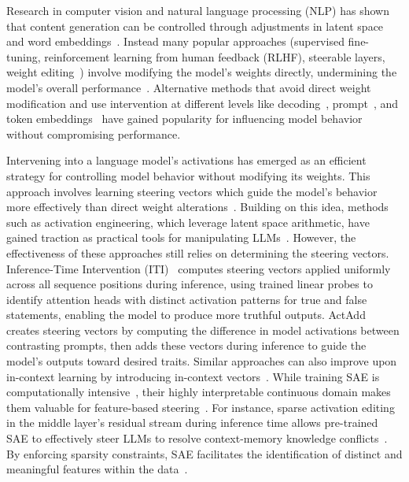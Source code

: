 Research in computer vision and natural language processing (NLP) has shown that content generation can be controlled through adjustments in latent space~\cite{larsen2016autoencoding,white2016sampling} and word embeddings~\cite{han2024word}. Instead many popular approaches (\ie supervised fine-tuning, reinforcement learning from human feedback (RLHF), steerable layers, weight editing~\cite{ranzato2015sequence,dathathri2019plug,ilharco2022editing,meng2022locating}) involve modifying the model's weights directly, undermining the model's overall performance~\cite{qi2023fine}. Alternative methods that avoid direct weight modification and use intervention at different levels  like decoding~\cite{gu2017trainable}, prompt~\cite{zhou2022steering}, and token embeddings~\cite{khashabi2021prompt} have gained popularity for influencing model behavior without compromising performance.



\par
Intervening into a language model’s activations has emerged as an efficient strategy for controlling model behavior without modifying its weights. This approach involves learning steering vectors which guide the model's behavior more effectively than direct weight alterations~\cite{hernandez2023inspecting,subramani2022extracting}. Building on this idea, methods such as activation engineering, which leverage latent space arithmetic, have gained traction as practical tools for manipulating LLMs~\cite{correia2019adaptively}. However, the effectiveness of these approaches still relies on determining the steering vectors. Inference-Time Intervention (ITI)~\cite{li2024inference} computes steering vectors applied uniformly across all sequence positions during inference, using trained linear probes to identify attention heads with distinct activation patterns for true and false statements, enabling the model to produce more truthful outputs. ActAdd~\cite{turner2023activation} creates steering vectors by computing the difference in model activations between contrasting prompts, then adds these vectors during inference to guide the model's outputs toward desired traits. Similar approaches can also improve upon in-context learning by introducing in-context vectors~\cite{liu2023context}. While training SAE is computationally intensive~\cite{gao2024scaling}, their highly interpretable continuous domain makes them valuable for feature-based steering~\cite{durmusevaluating}. For instance, sparse activation editing in the middle layer's residual stream during inference time allows pre-trained SAE to effectively steer LLMs to resolve context-memory knowledge conflicts~\cite{zhao2024steering}.  By enforcing sparsity constraints, SAE facilitates the identification of distinct and meaningful features within the data~\cite{chalnev2024improving,o2024steering}. 




